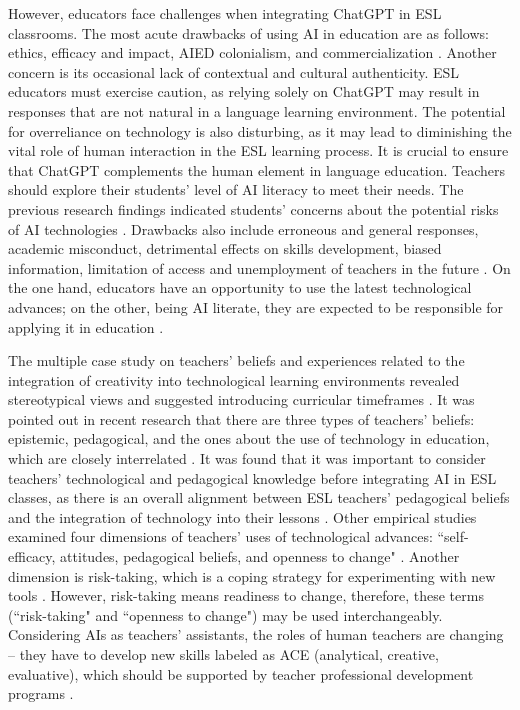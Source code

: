 \documentclass[english]{textolivre}
\begin{document}
However, educators face challenges when integrating ChatGPT in ESL classrooms. The most acute drawbacks of using AI in education are as follows: ethics, efficacy and impact, AIED colonialism, and commercialization \cite[p. 558]{holmes2022}. Another concern is its occasional lack of contextual and cultural authenticity. ESL educators must exercise caution, as relying solely on ChatGPT may result in responses that are not natural in a language learning environment. The potential for overreliance on technology is also disturbing, as it may lead to diminishing the vital role of human interaction in the ESL learning process. It is crucial to ensure that ChatGPT complements the human element in language education. Teachers should explore their students’ level of AI literacy to meet their needs. The previous research findings indicated students’ concerns about the potential risks of AI technologies \cite[p. 14]{chan2023}. Drawbacks also include erroneous and general responses, academic misconduct, detrimental effects on skills development, biased information, limitation of access and unemployment of teachers in the future \cite[p. 3]{meniado2023}. On the one hand, educators have an opportunity to use the latest technological advances; on the other, being AI literate, they are expected to be responsible for applying it in education \cite[p. 543]{holmes2022}.

The multiple case study on teachers’ beliefs and experiences related to the integration of creativity into technological learning environments revealed stereotypical views and suggested introducing curricular timeframes \cite[p. 21]{bereczki2021}. It was pointed out in recent research that there are three types of teachers’ beliefs: epistemic, pedagogical, and the ones about the use of technology in education, which are closely interrelated \cites[p. 245]{deng2014}[p. 20]{ding2019}. It was found that it was important to consider teachers’ technological and pedagogical knowledge before integrating AI in ESL classes, as there is an overall alignment between ESL teachers’ pedagogical beliefs and the integration of technology into their lessons \cites[p. 20]{ding2019}[p. 33]{sumakul2023}[p. 249]{sumakul2022}. Other empirical studies \cite{ertmer2005} examined four dimensions of teachers’ uses of technological advances: ``self-efficacy, attitudes, pedagogical beliefs, and openness to change" \cite[p. 309]{ottenbreit-leftwich2018}. Another dimension is risk-taking, which is a coping strategy for experimenting with new tools \cite[p. 1351]{howard2016}. However, risk-taking means readiness to change, therefore, these terms (``risk-taking" and ``openness to change") may be used interchangeably. Considering AIs as teachers’ assistants, the roles of human teachers are changing – they have to develop new skills labeled as ACE (analytical, creative, evaluative), which should be supported by teacher professional development programs \cite[p. 42]{sumakul2019}.
\end{document}
